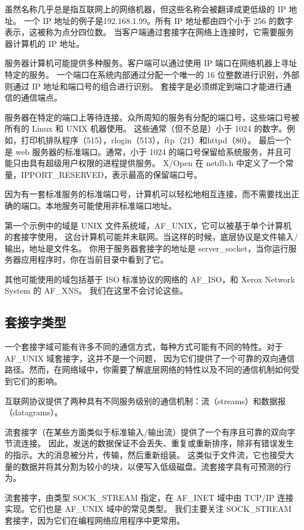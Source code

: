 \documentclass{ctexart}
\begin{document}
虽然名称几乎总是指互联网上的网络机器，但这些名称会被翻译成更低级的 IP 地址。
一个 IP 地址的例子是192.168.1.99。所有 IP 地址都由四个小于 256 的数字表示，这被称为点分四位数。
当客户端通过套接字在网络上连接时，它需要服务器计算机的 IP 地址。  
  
服务器计算机可能提供多种服务。客户端可以通过使用 IP 端口在网络机器上寻址特定的服务。
一个端口在系统内部通过分配一个唯一的 16 位整数进行识别，外部则通过 IP 地址和端口号的组合进行识别。
套接字是必须绑定到端口才能进行通信的通信端点。  
  
服务器在特定的端口上等待连接。众所周知的服务有分配的端口号，这些端口号被所有的 Linux 和 UNIX 机器使用。
这些通常（但不总是）小于 1024 的数字。例如，打印机排队程序（515），rlogin（513），ftp（21）和httpd（80）。
最后一个是 web 服务器的标准端口。通常，小于 1024 的端口号保留给系统服务，并且可能只由具有超级用户权限的进程提供服务。
X/Open 在 netdb.h 中定义了一个常量，IPPORT\_RESERVED，表示最高的保留端口号。
 
因为有一套标准服务的标准端口号，计算机可以轻松地相互连接，而不需要找出正确的端口。本地服务可能使用非标准端口地址。  
  
第一个示例中的域是 UNIX 文件系统域，AF\_UNIX，它可以被基于单个计算机的套接字使用，
这台计算机可能并未联网。当这样的时候，底层协议是文件输入/输出，地址是文件名。
你用于服务器套接字的地址是 server\_socket，当你运行服务器应用程序时，你在当前目录中看到了它。  
  
其他可能使用的域包括基于 ISO 标准协议的网络的 AF\_ISO，和 Xerox Network System 的 AF\_XNS。
我们在这里不会讨论这些。  

\subsection{套接字类型}  
一个套接字域可能有许多不同的通信方式，每种方式可能有不同的特性。对于 AF\_UNIX 域套接字，这并不是一个问题，
因为它们提供了一个可靠的双向通信路径。然而，在网络域中，你需要了解底层网络的特性以及不同的通信机制如何受到它们的影响。  
  
互联网协议提供了两种具有不同服务级别的通信机制：流（streams）和数据报（datagrams）。  

流套接字（在某些方面类似于标准输入/输出流）提供了一个有序且可靠的双向字节流连接。
因此，发送的数据保证不会丢失、重复或重新排序，除非有错误发生的指示。大的消息被分片，传输，然后重新组装。
这类似于文件流，它也接受大量的数据并将其分割为较小的块，以便写入低级磁盘。流套接字具有可预测的行为。  
  
流套接字，由类型 SOCK\_STREAM 指定，在 AF\_INET 域中由 TCP/IP 连接实现。它们也是 AF\_UNIX 域中的常见类型。
我们主要关注 SOCK\_STREAM 套接字，因为它们在编程网络应用程序中更常用。  
\end{document}
